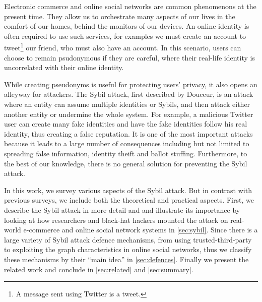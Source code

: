 Electronic commerce and online social networks are common phenomenons at the
present time. They allow us to orchestrate many aspects of our lives in the
comfort of our homes, behind the monitors of our devices. An online identity is
often required to use such services, for examples we must create an account to
tweet\footnote{A message sent using Twitter is a tweet.} our friend, who must
also have an account. In this scenario, users can choose to remain psudonymous
if they are careful, where their real-life identity is uncorrelated with their
online identity. %

While creating pseudonyms is useful for protecting users' privacy, it also opens
an alleyway for attackers. The Sybil attack, first described by
Douceur\cite{douceur2002sybil}, is an attack where an entity can assume multiple
identities or Sybils, and then attack either another entity or undermine the
whole system. For example, a malicious Twitter user can create many fake
identities and have the fake identities follow his real identity, thus creating
a false reputation. It is one of the most important attacks because it leads to
a large number of consequences including but not limited to spreading false
information, identity theift\cite{bilge2009all} and ballot
stuffing\cite{bhattacharjee2005avoiding}. Furthermore, to the best of our
knowledge, there is no general solution for preventing the Sybil attack.

In this work, we survey various aspects of the Sybil attack. But in contrast
with previous surveys, we include both the theoretical and practical aspects.
First, we describe the Sybil attack in more detail and and illustrate its
importance by looking at how researchers and black-hat hackers mounted the
attack on real-world e-commerce and online social network systems in
\autoref{sec:sybil}. Since there is a large variety of Sybil attack defence
mechanisms, from using trusted-third-party to exploiting the graph
characteristics in online social networks, thus we classify these mechanisms by
their ``main idea'' in \autoref{sec:defences}. Finally we present the related
work and conclude in \autoref{sec:related} and \autoref{sec:summary}.

